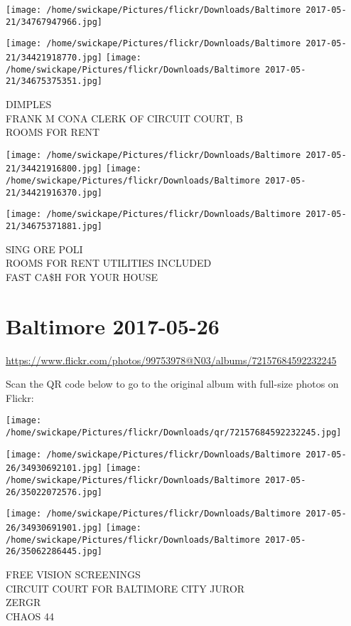 \documentclass[10pt,letterpaper]{article}
\begin{document}
\texttt{[image: /home/swickape/Pictures/flickr/Downloads/Baltimore 2017-05-21/34767947966.jpg]}

\vspace{0.25in}
\texttt{[image: /home/swickape/Pictures/flickr/Downloads/Baltimore 2017-05-21/34421918770.jpg]}
\texttt{[image: /home/swickape/Pictures/flickr/Downloads/Baltimore 2017-05-21/34675375351.jpg]}

DIMPLES\\
FRANK M CONA CLERK OF CIRCUIT COURT, B\\
ROOMS FOR RENT
\pagebreak

\texttt{[image: /home/swickape/Pictures/flickr/Downloads/Baltimore 2017-05-21/34421916800.jpg]}
\texttt{[image: /home/swickape/Pictures/flickr/Downloads/Baltimore 2017-05-21/34421916370.jpg]}

\texttt{[image: /home/swickape/Pictures/flickr/Downloads/Baltimore 2017-05-21/34675371881.jpg]}

SING ORE POLI\\
ROOMS FOR RENT UTILITIES INCLUDED\\
FAST CA\$H FOR YOUR HOUSE
\pagebreak

\section*{Baltimore 2017-05-26}

\url{https://www.flickr.com/photos/99753978@N03/albums/72157684592232245}

Scan the QR code below to go to the original album with full-size photos on Flickr:

\texttt{[image: /home/swickape/Pictures/flickr/Downloads/qr/72157684592232245.jpg]}
\pagebreak

\texttt{[image: /home/swickape/Pictures/flickr/Downloads/Baltimore 2017-05-26/34930692101.jpg]}
\texttt{[image: /home/swickape/Pictures/flickr/Downloads/Baltimore 2017-05-26/35022072576.jpg]}

\texttt{[image: /home/swickape/Pictures/flickr/Downloads/Baltimore 2017-05-26/34930691901.jpg]}
\texttt{[image: /home/swickape/Pictures/flickr/Downloads/Baltimore 2017-05-26/35062286445.jpg]}

FREE VISION SCREENINGS\\
CIRCUIT COURT FOR BALTIMORE CITY JUROR\\
ZERGR\\
CHAOS 44
\pagebreak
\end{document}
